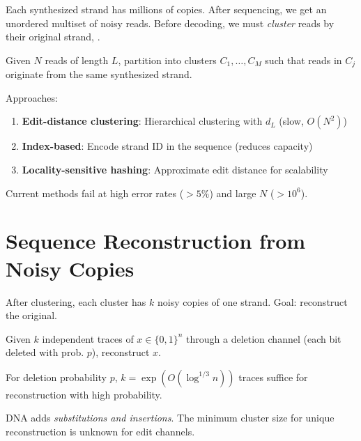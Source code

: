 Each synthesized strand has millions of copies. After sequencing, we get an unordered multiset of noisy reads. Before decoding, we must \emph{cluster} reads by their original strand, \cite{barlev2022dna}.

\begin{problem}
Given $N$ reads of length $L$, partition into clusters $C_1,\dots,C_M$ such that reads in $C_j$ originate from the same synthesized strand.
\end{problem}

Approaches:
\begin{enumerate}
    \item \textbf{Edit-distance clustering}: Hierarchical clustering with $d_L$ (slow, $O(N^2)$)
    \item \textbf{Index-based}: Encode strand ID in the sequence (reduces capacity)
    \item \textbf{Locality-sensitive hashing}: Approximate edit distance for scalability \cite{barlev2022dna}
\end{enumerate}

Current methods fail at high error rates ($>5\%$) and large $N$ ($>10^6$).

\section{Sequence Reconstruction from Noisy Copies}
\label{sec:dna:reconstruction}

After clustering, each cluster has $k$ noisy copies of one strand. Goal: reconstruct the original.

\begin{problem}
Given $k$ independent traces of $x \in \{0,1\}^n$ through a deletion channel (each bit deleted with prob. $p$), reconstruct $x$.
\end{problem}

\begin{theorem}[Batu et al. 2004]
For deletion probability $p$, $k = \exp(O(\log^{1/3} n))$ traces suffice for reconstruction with high probability.
\end{theorem}

DNA adds \emph{substitutions and insertions}. The minimum cluster size for unique reconstruction is unknown for edit channels.

